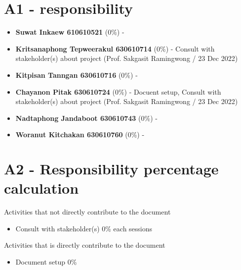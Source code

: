 \documentclass[ 10pt]{report}
\begin{document}
        \section{A1 - responsibility}
        \begin{itemize}
            \item \textbf{Suwat Inkaew 610610521} (0\%) - 
            \item \textbf{Kritsanaphong Tepweerakul 630610714} (0\%) - Consult with stakeholder(s) about project (Prof. Sakgasit Ramingwong / 23 Dec 2022)
            \item \textbf{Kitpisan Tanngan 630610716} (0\%) - 
            \item \textbf{Chayanon Pitak 630610724} (0\%) - Docuent setup, Consult with stakeholder(s) about project (Prof. Sakgasit Ramingwong / 23 Dec 2022)
            \item \textbf{Nadtaphong Jandaboot 630610743} (0\%) - 
            \item \textbf{Woranut Kitchakan 630610760} (0\%) - 
        \end{itemize}

        \section{A2 - Responsibility percentage calculation}

        Activities that not directly contribute to the document
        \begin{itemize}
            \item Consult with stakeholder(s) 0\% each sessions
        \end{itemize}
        \indent\indent Activities that is directly contribute to the document
        \begin{itemize}
            \item Document setup 0\%
        \end{itemize}
\end{document}
